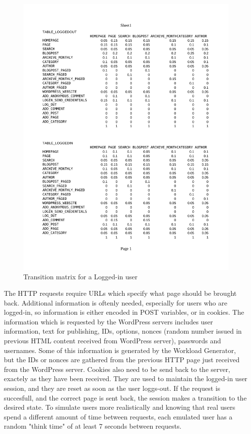   \begin{figure}[t]
    \centering %
    \includegraphics[trim=2cm 14cm 2cm 3.2cm, clip=true, scale=0.85]{src/img/transitionTable.pdf}
    \caption{Transition matrix for a Logged-in user}
  \end{figure}

The HTTP requests require URLs which specify what page should be brought back. Additional information is oftenly needed, especially for users who are logged-in, so information is either encoded in POST variables, or in cookies. The information which is requested by the WordPress servers includes user information, text for publishing, IDs, options, nonces (random number issued in previous HTML content received from WordPress server), passwords and usernames. Some of this information is generated by the Workload Generator, but the IDs or nonces are gathered from the previous HTTP page just received from the WordPress server. Cookies also need to be send back to the server, exactely as they have been received. They are used to maintain the logged-in user session, and they are reset as soon as the user loggs-out. If the request is succesfull, and the correct page is sent back, the session makes a transition to the desired state. To simulate users more realistically and knowing that real users spend a different amount of time between requests, each emulated user has a random "think time" of at least 7 seconds between requests.

